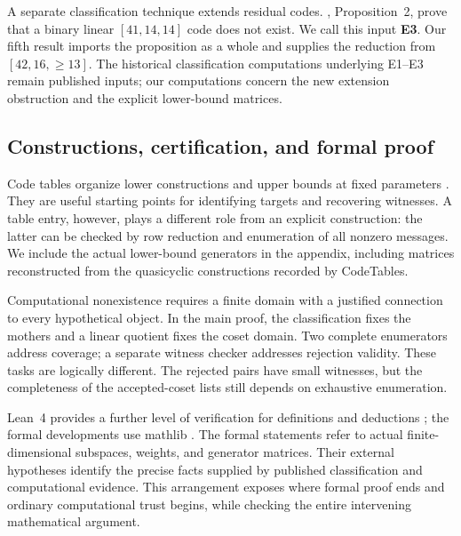 A separate classification technique extends residual codes. \citet{bouyuklieva2020}, Proposition~2, prove that a binary linear $[41,14,14]$ code does not exist. We call this input \textbf{E3}. Our fifth result imports the proposition as a whole and supplies the reduction from $[42,16,\ge13]$. The historical classification computations underlying E1--E3 remain published inputs; our computations concern the new extension obstruction and the explicit lower-bound matrices.

\subsection{Constructions, certification, and formal proof}
Code tables organize lower constructions and upper bounds at fixed parameters \citep{grasslTables}. They are useful starting points for identifying targets and recovering witnesses. A table entry, however, plays a different role from an explicit construction: the latter can be checked by row reduction and enumeration of all nonzero messages. We include the actual lower-bound generators in the appendix, including matrices reconstructed from the quasicyclic constructions recorded by CodeTables.

Computational nonexistence requires a finite domain with a justified connection to every hypothetical object. In the main proof, the classification fixes the mothers and a linear quotient fixes the coset domain. Two complete enumerators address coverage; a separate witness checker addresses rejection validity. These tasks are logically different. The rejected pairs have small witnesses, but the completeness of the accepted-coset lists still depends on exhaustive enumeration.

Lean~4 provides a further level of verification for definitions and deductions \citep{lean2021}; the formal developments use mathlib \citep{mathlib2020}. The formal statements refer to actual finite-dimensional subspaces, weights, and generator matrices. Their external hypotheses identify the precise facts supplied by published classification and computational evidence. This arrangement exposes where formal proof ends and ordinary computational trust begins, while checking the entire intervening mathematical argument.
